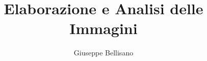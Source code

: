\documentclass[a4paper,10pt,oneside]{book}
\title{Elaborazione e Analisi delle Immagini}
\author{Giuseppe Bellisano}
\date{}
\begin{document}
\maketitle
\tableofcontents 					%


















\printindex				%

\printglossaries		%
\end{document}
